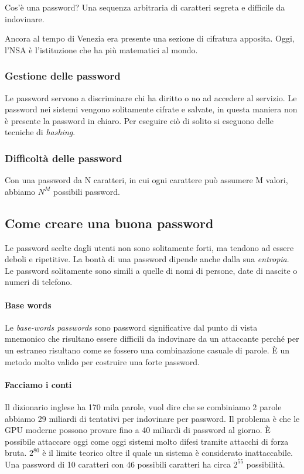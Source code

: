 Cos'è una password? Una sequenza arbitraria di caratteri segreta e difficile da
indovinare.

Ancora al tempo di Venezia era presente una sezione di cifratura
apposita. Oggi, l'NSA è l'istituzione che ha più matematici al mondo.

\subsubsection{Gestione delle password}

Le password servono a discriminare chi ha diritto o no ad accedere al servizio.
Le password nei sistemi vengono solitamente cifrate e salvate, in questa
maniera non è presente la password in chiaro. Per eseguire ciò di solito si
eseguono delle tecniche di \textit{hashing}.

\subsubsection{Difficoltà delle password}

Con una password da N caratteri, in cui ogni carattere può assumere M valori,
abbiamo $N^M$ possibili password.

\subsection{Come creare una buona password}

Le password scelte dagli utenti non sono solitamente forti, ma tendono ad
essere deboli e ripetitive. La bontà di una password dipende anche dalla sua
\textit{entropia}.
Le password solitamente sono simili a quelle di nomi di persone, date di
nascite o numeri di telefono.

\paragraph*{Base words}
Le \textit{base-words passwords} sono password significative dal punto di vista
mnemonico che risultano essere difficili da indovinare da un attaccante perché
per un estraneo risultano come se fossero una combinazione casuale di parole.
È un metodo molto valido per costruire una forte password.

\paragraph*{Facciamo i conti}

Il dizionario inglese ha 170 mila parole, vuol dire che se combiniamo 2 parole
abbiamo 29 miliardi di tentativi per indovinare per password. Il problema è che
le GPU moderne possono provare fino a 40 miliardi di password al giorno.
È possibile attaccare oggi come oggi sistemi molto difesi tramite attacchi di
forza bruta.
$2^{80}$ è il limite teorico oltre il quale un sistema è considerato
inattaccabile. Una password di 10 caratteri con 46 possibili caratteri ha circa
$2^{55}$ possibilità.

